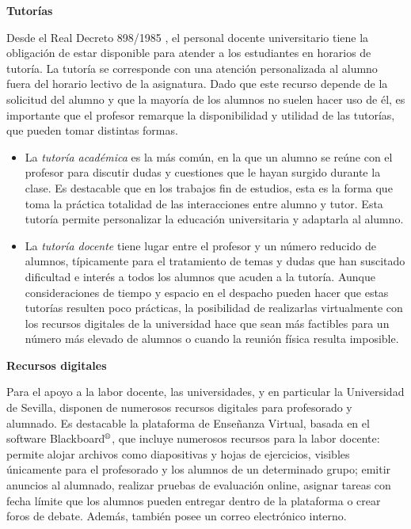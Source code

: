 \documentclass[a4paper,12pt,twoside]{article}
\begin{document}
\textbf{Tutorías} 

Desde el Real Decreto 898/1985 \cite{tutorias}, el personal docente universitario tiene la obligación de estar disponible para atender a los estudiantes en horarios de tutoría. La tutoría se corresponde con una atención personalizada al alumno fuera del horario lectivo de la asignatura. Dado que este recurso depende de la solicitud del alumno y que la mayoría de los alumnos no suelen hacer uso de él, es importante que el profesor remarque la disponibilidad y utilidad de las tutorías, que pueden tomar distintas formas. 

\begin{itemize}
\item La \textit{tutoría académica} es la más común, en la que un alumno se reúne con el profesor para discutir dudas y cuestiones que le hayan surgido durante la clase. Es destacable que en los trabajos fin de estudios, esta es la forma que toma la práctica totalidad de las interacciones entre alumno y tutor. Esta tutoría permite personalizar la educación universitaria y adaptarla al alumno.

\item La \textit{tutoría docente} tiene lugar entre el profesor y un número reducido de alumnos, típicamente para el tratamiento de temas y dudas que han suscitado dificultad e interés a todos los alumnos que acuden a la tutoría. Aunque consideraciones de tiempo y espacio en el despacho pueden hacer que estas tutorías resulten poco prácticas, la posibilidad de realizarlas virtualmente con los recursos digitales de la universidad hace que sean más factibles para un número más elevado de alumnos o cuando la reunión física resulta imposible.
\end{itemize}

\textbf{Recursos digitales}

Para el apoyo a la labor docente, las universidades, y en particular la Universidad de Sevilla, disponen de numerosos recursos digitales para profesorado y alumnado. Es destacable la plataforma de Enseñanza Virtual, basada en el software Blackboard$^\text{\textregistered}$, que incluye numerosos recursos para la labor docente: permite alojar archivos como diapositivas y hojas de ejercicios, visibles únicamente para el profesorado y los alumnos de un determinado grupo; emitir anuncios al alumnado, realizar pruebas de evaluación online, asignar tareas con fecha límite que los alumnos pueden entregar dentro de la plataforma o crear foros de debate. Además, también posee un correo electrónico interno.
\end{document}
